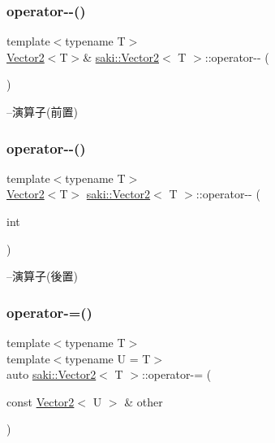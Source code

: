 \subsubsection{\texorpdfstring{operator-\/-\/()}{operator--()}\hspace{0.1cm}{\footnotesize\ttfamily [1/2]}}
{\footnotesize\ttfamily template$<$typename T$>$ \\
\mbox{\hyperlink{classsaki_1_1_vector2}{Vector2}}$<$T$>$\& \mbox{\hyperlink{classsaki_1_1_vector2}{saki\+::\+Vector2}}$<$ T $>$\+::operator-\/-\/ (\begin{DoxyParamCaption}{ }\end{DoxyParamCaption})\hspace{0.3cm}{\ttfamily [inline]}}



--演算子(前置) 

\mbox{\label{classsaki_1_1_vector2_adf7dcca2ef5c70fdf172a005b3474702}} 
\subsubsection{\texorpdfstring{operator-\/-\/()}{operator--()}\hspace{0.1cm}{\footnotesize\ttfamily [2/2]}}
{\footnotesize\ttfamily template$<$typename T$>$ \\
\mbox{\hyperlink{classsaki_1_1_vector2}{Vector2}}$<$T$>$ \mbox{\hyperlink{classsaki_1_1_vector2}{saki\+::\+Vector2}}$<$ T $>$\+::operator-\/-\/ (\begin{DoxyParamCaption}\item[{int}]{ }\end{DoxyParamCaption})\hspace{0.3cm}{\ttfamily [inline]}}



--演算子(後置) 

\mbox{\label{classsaki_1_1_vector2_aaf222bfb3a2e02a1570ce2e90c41fdd0}} 
\subsubsection{\texorpdfstring{operator-\/=()}{operator-=()}}
{\footnotesize\ttfamily template$<$typename T$>$ \\
template$<$typename U  = T$>$ \\
auto \mbox{\hyperlink{classsaki_1_1_vector2}{saki\+::\+Vector2}}$<$ T $>$\+::operator-\/= (\begin{DoxyParamCaption}\item[{const \mbox{\hyperlink{classsaki_1_1_vector2}{Vector2}}$<$ U $>$ \&}]{other }\end{DoxyParamCaption})\hspace{0.3cm}{\ttfamily [inline]}}



